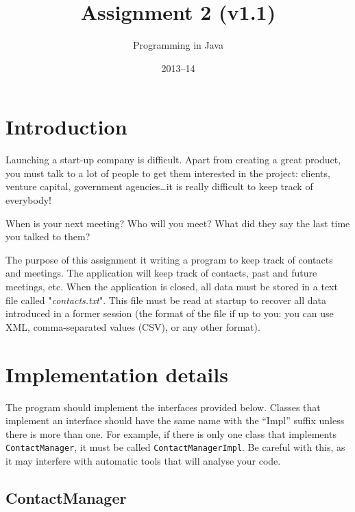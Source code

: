 \documentclass{article}
\title{Assignment 2 (v1.1)}
\author{Programming in Java}
\date{2013--14}
\begin{document}
\maketitle

\section{Introduction}
\label{sec:introduction}

Launching a start-up company is difficult. Apart from creating a great
product, you must talk to a lot of people to get them interested in
the project: clients, venture capital, government agencies\ldots it is
really difficult to keep track of everybody! 

When is your next meeting? Who will you meet? What did they say the
last time you talked to them?

The purpose of this assignment it writing a program to keep track of
contacts and meetings. The application will keep track of contacts,
past and future meetings, etc. When the application is closed, all
data must be stored in a text file called "\emph{contacts.txt}". This
file must be read at startup to recover all data introduced in a
former session (the format of the file if up to you: you can use XML,
comma-separated values (CSV), or any other format).

\section{Implementation details}
\label{sec:impl-deta}

The program should implement the interfaces
provided below. Classes that implement an interface should have the same
name with the ``Impl'' suffix unless there is more than one. For
example, if there is only one class that implements
\verb+ContactManager+, it must be called \verb+ContactManagerImpl+. Be
careful with this, as it may interfere with automatic tools that will
analyse your code. 

\subsection{ContactManager}
\label{sec:contactmanager}

\end{document}
